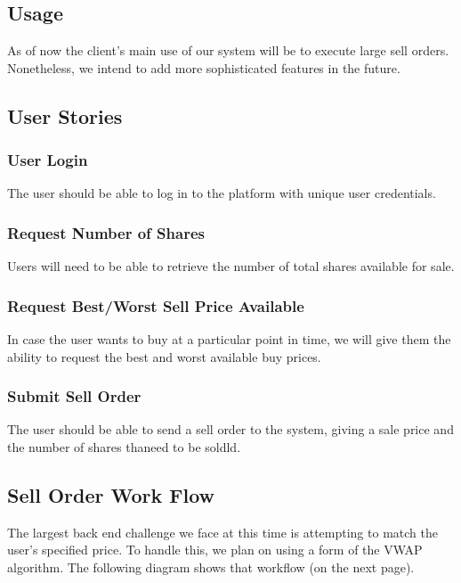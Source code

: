 \documentclass{article}
\begin{document}
\subsection{Usage}
As of now the client's main use of our system will be to execute large sell orders. Nonetheless, we intend to add more sophisticated features in the future.

\subsection{User Stories}

\subsubsection{User Login}

The user should be able to log in to the platform with unique user credentials.

\subsubsection{Request Number of Shares}

Users will need to be able to retrieve the number of total shares available for sale.

\subsubsection{Request Best/Worst Sell Price Available}

In case the user wants to buy at a particular point in time, we will give them the ability to request the best and worst available buy prices. 

\subsubsection{Submit Sell Order}

The user should be able to send a sell order to the system, giving a sale price and the number of shares thaneed to be soldld.

\subsection{Sell Order Work Flow}

The largest back end challenge we face at this time is attempting to match the user's specified price. To handle this, we plan on using a form of the VWAP algorithm. The following diagram shows that workflow (on the next page).
\end{document}
